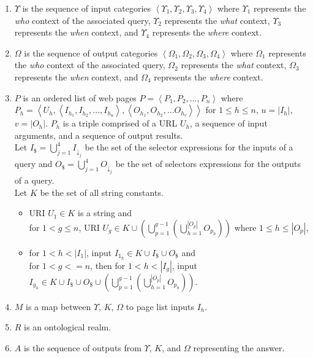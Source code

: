 \begin{enumerate}
\item $\Upsilon$ is the sequence of input categories $\left<
  \Upsilon_{1}, \Upsilon_{2}, \Upsilon_{3}, \Upsilon_{4} \right>$
  where $\Upsilon_{1}$ represents the \emph{who} context of the
  associated query, $\Upsilon_{2}$ represents the \emph{what} context,
  $\Upsilon_{3}$ represents the \emph{when} context, and
  $\Upsilon_{4}$ represents the \emph{where} context.

\item $\Omega$ is the sequence of output categories $\left<\Omega_{1},
  \Omega_{2}, \Omega_{3}, \Omega_{4}\right>$ where $\Omega_{1}$
  represents the \emph{who} context of the associated query,
  $\Omega_{2}$ represents the \emph{what} context, $\Omega_{3}$
  represents the \emph{when} context, and $\Omega_{4}$ represents the
  \emph{where} context.

\item $P$ is an ordered list of web pages $P = \left<P_1,P_2,...,
  P_n\right>$ where $P_h =
  \left<U_h,\left<I_{h_1},I_{h_2},...,I_{h_u}\right>,\left<O_{h_1},O_{h_2},...O_{h_v}\right>\right>$
  for $1 \leq h \leq n$, $u = \left| I_h \right|$, $v = \left| O_h
  \right|$. $P_h$ is a triple comprised of a URL $U_h$, a sequence of
  input arguments, and a sequence of output results.  \\ Let $I_{\$} =
  \bigcup_{j=1}^{4} I_{\downarrow_j}$ be the set of the selector
  expressions for the inputs of a query and $O_{\$} =
  \bigcup_{j=1}^{4} O_{\downarrow_j}$ be the set of selectors
  expressions for the outputs of a query.  \\ Let $K$ be the set of
  all string constants.
\begin{itemize}
\item URI $U_1 \in K$ is a string and \\ for $1 < g \leq n$, URI $U_g
  \in K \cup \left( \bigcup^{g-1}_{p=1} \left(
  \bigcup^{\left|O_p\right|}_{h=1}O_{p_h} \right)\right)$ where $1
  \leq h \leq \left| O_p \right| $,

\item for $1 < h < \left| I_1 \right|$, input $I_{1_h} \in K \cup
  I_{\$} \cup O_{\$}$ and \\ for $1 < g <= n$, then for $1 < h <
  \left| I_g \right|$, input $I_{g_h} \in K \cup I_{\$} \cup O_{\$}
  \cup \left( \bigcup^{g-1}_{p=1} \left(
  \bigcup^{\left|O_p\right|}_{h=1}O_{p_h} \right)\right)$.
\end{itemize}

\item $M$ is a map between $\Upsilon$, $K$, $\Omega$ to page list inputs $I_h$.

\item $R$ is an ontological realm. 

\item $A$ is the sequence of outputs from $\Upsilon$, $K$, and
  $\Omega$ representing the answer.

\end{enumerate}

